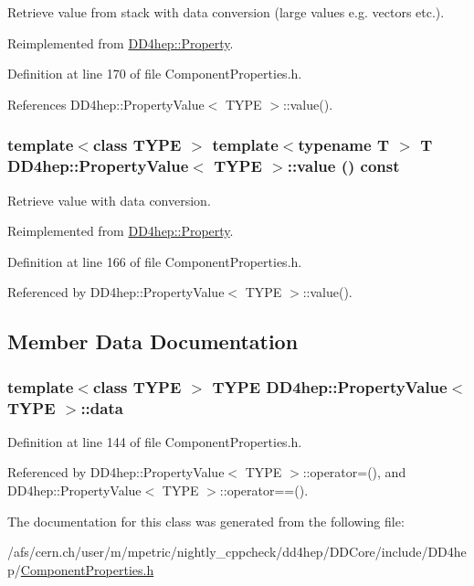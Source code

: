 Retrieve value from stack with data conversion (large values e.g. vectors etc.). 

Reimplemented from \hyperlink{class_d_d4hep_1_1_property_a0ad39ca9d70318555ad137780185e92d}{DD4hep::Property}.

Definition at line 170 of file ComponentProperties.h.

References DD4hep::PropertyValue$<$ TYPE $>$::value().\hypertarget{class_d_d4hep_1_1_property_value_a4a0c43ad417f9dd13c618625bac0fb9b}{
\subsubsection[{value}]{\setlength{\rightskip}{0pt plus 5cm}template$<$class TYPE $>$ template$<$typename T $>$ {\bf T} {\bf DD4hep::PropertyValue}$<$ TYPE $>$::value () const}}
\label{class_d_d4hep_1_1_property_value_a4a0c43ad417f9dd13c618625bac0fb9b}


Retrieve value with data conversion. 

Reimplemented from \hyperlink{class_d_d4hep_1_1_property_a8aa2bfdecfc6cdb06c4f8c1cf7a01600}{DD4hep::Property}.

Definition at line 166 of file ComponentProperties.h.

Referenced by DD4hep::PropertyValue$<$ TYPE $>$::value().

\subsection{Member Data Documentation}
\hypertarget{class_d_d4hep_1_1_property_value_ad38a9abb3265886b815fa435ca481e24}{
\subsubsection[{data}]{\setlength{\rightskip}{0pt plus 5cm}template$<$class TYPE $>$ TYPE {\bf DD4hep::PropertyValue}$<$ TYPE $>$::{\bf data}}}
\label{class_d_d4hep_1_1_property_value_ad38a9abb3265886b815fa435ca481e24}


Definition at line 144 of file ComponentProperties.h.

Referenced by DD4hep::PropertyValue$<$ TYPE $>$::operator=(), and DD4hep::PropertyValue$<$ TYPE $>$::operator==().

The documentation for this class was generated from the following file:\begin{DoxyCompactItemize}
\item 
/afs/cern.ch/user/m/mpetric/nightly\_\-cppcheck/dd4hep/DDCore/include/DD4hep/\hyperlink{_component_properties_8h}{ComponentProperties.h}\end{DoxyCompactItemize}
